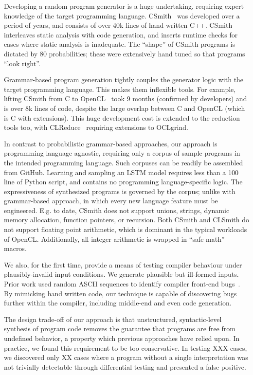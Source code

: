 Developing a random program generator is a huge undertaking, requiring expert knowledge of the target programming language. CSmith~\cite{Yang2011} was developed over a period of years, and consists of over 40k lines of hand-written C++. CSmith interleaves static analysis with code generation, and inserts runtime checks for cases where static analysis is inadequate. The ``shape'' of CSmith programs is dictated by 80 probabilities; these were extensively hand tuned so that programs ``look right''.

Grammar-based program generation tightly couples the generator logic with the target programming language. This makes them inflexible tools. For example, lifting CSmith from C to OpenCL~\cite{Lidbury2015a} took 9 months (confirmed by developers) and is over 8k lines of code, despite the large overlap between C and OpenCL (which is C with extensions). This huge development cost is extended to the reduction tools too, with CLReduce~\cite{Pflanzer2016} requiring extensions to OCLgrind.


In contrast to probabilistic grammar-based approaches, our approach is programming language agnostic, requiring only a corpus of sample programs in the intended programming language. Such corpuses can be readily be assembled from GitHub. Learning and sampling an LSTM model requires less than a 100 line of Python script, and contains no programming language-specific logic. The expressiveness of synthesized programs is governed by the corpus; unlike with grammar-based approach, in which every new language feature must be engineered. E.g. to date, CSmith does not support unions, strings, dynamic memory allocation, function pointers, or recursion. Both CSmith and CLSmith do not support floating point arithmetic, which is dominant in the typical workloads of OpenCL. Additionally, all integer arithmetic is wrapped in ``safe math'' macros.

We also, for the first time, provide a means of testing compiler behaviour under plausibly-invalid input conditions. We generate plausible but ill-formed inputs. Prior work used random ASCII sequences to identify compiler front-end bugs~\cite{McKeeman1998}. By mimicking hand written code, our technique is capable of discovering bugs further within the compiler, including middle-end and even code generation.

The design trade-off of our approach is that unstructured, syntactic-level synthesis of program code removes the guarantee that programs are free from undefined behavior, a property which previous approaches have relied upon. In practice, we found this requirement to be too conservative. In testing XXX cases, we discovered only XX cases where a program without a single interpretation was not trivially detectable through differential testing and presented a false positive.

